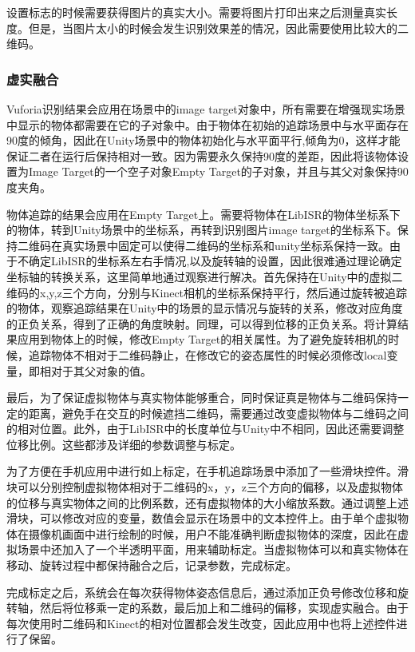 设置标志的时候需要获得图片的真实大小。需要将图片打印出来之后测量真实长度。但是，当图片太小的时候会发生识别效果差的情况，因此需要使用比较大的二维码。

\subsubsection{虚实融合}
Vuforia识别结果会应用在场景中的image target对象中，所有需要在增强现实场景中显示的物体都需要在它的子对象中。由于物体在初始的追踪场景中与水平面存在90度的倾角，因此在Unity场景中的物体初始化与水平面平行,倾角为0，这样才能保证二者在运行后保持相对一致。因为需要永久保持90度的差距，因此将该物体设置为Image Target的一个空子对象Empty Target的子对象，并且与其父对象保持90度夹角。

物体追踪的结果会应用在Empty Target上。需要将物体在LibISR的物体坐标系下的物体，转到Unity场景中的坐标系，再转到识别图片image target的坐标系下。保持二维码在真实场景中固定可以使得二维码的坐标系和unity坐标系保持一致。由于不确定LibISR的坐标系左右手情况,以及旋转轴的设置，因此很难通过理论确定坐标轴的转换关系，这里简单地通过观察进行解决。首先保持在Unity中的虚拟二维码的x,y,z三个方向，分别与Kinect相机的坐标系保持平行，然后通过旋转被追踪的物体，观察追踪结果在Unity中的场景的显示情况与旋转的关系，修改对应角度的正负关系，得到了正确的角度映射。同理，可以得到位移的正负关系。将计算结果应用到物体上的时候，修改Empty Target的相关属性。为了避免旋转相机的时候，追踪物体不相对于二维码静止，在修改它的姿态属性的时候必须修改local变量，即相对于其父对象的值。

最后，为了保证虚拟物体与真实物体能够重合，同时保证真是物体与二维码保持一定的距离，避免手在交互的时候遮挡二维码，需要通过改变虚拟物体与二维码之间的相对位置。此外，由于LibISR中的长度单位与Unity中不相同，因此还需要调整位移比例。这些都涉及详细的参数调整与标定。

为了方便在手机应用中进行如上标定，在手机追踪场景中添加了一些滑块控件。滑块可以分别控制虚拟物体相对于二维码的x，y，z三个方向的偏移，以及虚拟物体的位移与真实物体之间的比例系数，还有虚拟物体的大小缩放系数。通过调整上述滑块，可以修改对应的变量，数值会显示在场景中的文本控件上。由于单个虚拟物体在摄像机画面中进行绘制的时候，用户不能准确判断虚拟物体的深度，因此在虚拟场景中还加入了一个半透明平面，用来辅助标定。当虚拟物体可以和真实物体在移动、旋转过程中都保持融合之后，记录参数，完成标定。

完成标定之后，系统会在每次获得物体姿态信息后，通过添加正负号修改位移和旋转轴，然后将位移乘一定的系数，最后加上和二维码的偏移，实现虚实融合。由于每次使用时二维码和Kinect的相对位置都会发生改变，因此应用中也将上述控件进行了保留。


